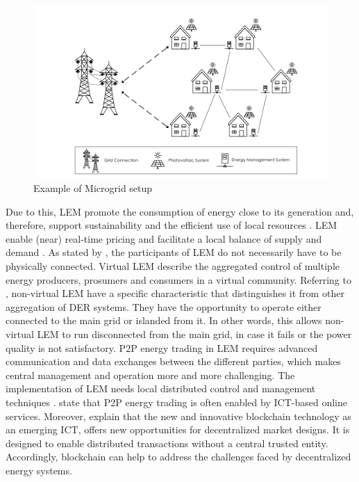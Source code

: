 \begin{figure}[htbp]
	\centering
	\includegraphics[width=.9\linewidth]{./figures/microgrid_1024x.png}
	\caption{Example of Microgrid setup \protect{}}
	\label{figure:microgrid}
\end{figure}

Due to this, LEM promote the consumption of energy close to its generation and, therefore, 
support sustainability and the efficient use of local resources .
LEM enable (near) real-time pricing and facilitate a local balance
of supply and demand . 
As stated by ,
the participants of LEM do not necessarily have to be physically connected. Virtual LEM
describe the aggregated control of multiple energy producers, prosumers and consumers in a virtual 
community.
Referring to , non-virtual LEM have a specific characteristic
that distinguishes it from other aggregation of DER systems. They have the opportunity
to operate either connected to the main grid or islanded from it. In other words,
this allows non-virtual LEM to run disconnected from the main grid, in case it fails or 
the power quality is not satisfactory.
P2P energy trading in LEM requires advanced communication and data 
exchanges between the different parties, which makes central management and 
operation more and more challenging. The implementation of LEM needs 
local distributed control and management techniques . 
 state that P2P energy trading is often
enabled by ICT-based online services. Moreover,  explain that 
the new and innovative blockchain technology as an emerging ICT, 
offers new opportunities for decentralized market designs.
It is designed to enable distributed transactions without 
a central trusted entity.
Accordingly, blockchain can help to address the challenges faced by 
decentralized energy systems. 


